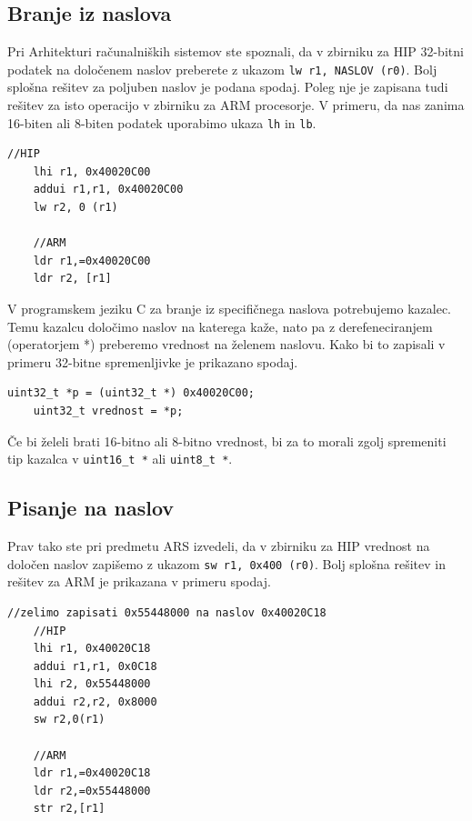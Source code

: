 \documentclass[12pt,letterpaper]{article}
\begin{document}
\subsection*{Branje iz naslova}

Pri Arhitekturi računalniških sistemov ste spoznali, da v zbirniku za HIP 32-bitni podatek na določenem naslov preberete z ukazom \texttt{lw r1, NASLOV (r0)}. Bolj splošna rešitev za poljuben naslov je podana spodaj. Poleg nje je zapisana tudi rešitev za isto operacijo v zbirniku za ARM procesorje. V primeru, da nas zanima 16-biten ali 8-biten podatek uporabimo ukaza \texttt{lh} in \texttt{lb}.

\begin{center}
\begin{lstlisting}[style=CStyle]
    //HIP
    lhi r1, 0x40020C00
    addui r1,r1, 0x40020C00
    lw r2, 0 (r1)
    
    //ARM
    ldr r1,=0x40020C00
    ldr r2, [r1]
\end{lstlisting}
\end{center}

V programskem jeziku C za branje iz specifičnega naslova potrebujemo kazalec. Temu kazalcu določimo naslov na katerega kaže, nato pa z derefeneciranjem (operatorjem *) preberemo vrednost na želenem naslovu. Kako bi to zapisali v primeru 32-bitne spremenljivke je prikazano spodaj.

\begin{center}
\begin{lstlisting}[style=CStyle]
    uint32_t *p = (uint32_t *) 0x40020C00;
    uint32_t vrednost = *p;
\end{lstlisting}
\end{center}

Če bi želeli brati 16-bitno ali 8-bitno vrednost, bi za to morali zgolj spremeniti tip kazalca v \texttt{uint16\_t *} ali \texttt{uint8\_t *}.

\subsection*{Pisanje na naslov}

Prav tako ste pri predmetu ARS izvedeli, da v zbirniku za HIP vrednost na določen naslov zapišemo z ukazom \texttt{sw r1, 0x400 (r0)}. Bolj splošna rešitev in rešitev za ARM je prikazana v primeru spodaj.

\begin{center}
\begin{lstlisting}[style=CStyle]
    //zelimo zapisati 0x55448000 na naslov 0x40020C18
    //HIP
    lhi r1, 0x40020C18
    addui r1,r1, 0x0C18
    lhi r2, 0x55448000
    addui r2,r2, 0x8000
    sw r2,0(r1)
    
    //ARM
    ldr r1,=0x40020C18
    ldr r2,=0x55448000
    str r2,[r1]
\end{lstlisting}
\end{center}
\end{document}
